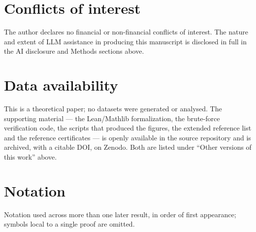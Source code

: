 \documentclass[a4paper,11pt,oneside,reqno]{amsart}
\theoremstyle{definition}
\theoremstyle{remark}
\theoremstyle{plain}
\begin{document}
\section*{Conflicts of interest}

The author declares no financial or non-financial conflicts of interest. The nature and extent of
LLM assistance in producing this manuscript is disclosed in full in the AI disclosure and Methods
sections above.

\section*{Data availability}

This is a theoretical paper; no datasets were generated or analysed. The supporting material --- the
Lean/Mathlib formalization, the brute-force verification code, the scripts that produced the
figures, the extended reference list and the reference certificates --- is openly available in the
source repository and is archived, with a citable DOI, on Zenodo. Both are listed under ``Other
versions of this work'' above.

\section*{Notation}

Notation used across more than one later result, in order of first appearance; symbols local to a
single proof are omitted.
\end{document}
